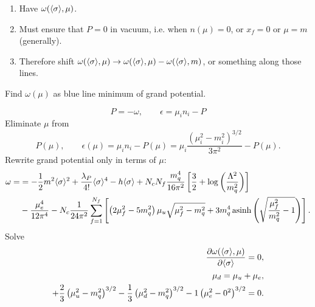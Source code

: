 \begin{enumerate}
\item Have $\omega(\langle \sigma \rangle, \mu)$.
\item Must ensure that $P = 0$ in vacuum, i.e. when $n(\mu) = 0$, or $x_f = 0$ or $\mu = m$ (generally).
\item Therefore shift $\omega(\langle \sigma \rangle,\mu) \rightarrow \omega(\langle \sigma \rangle,\mu) - \omega(\langle \sigma \rangle,m)$, or something along those lines.
\end{enumerate}

Find $\omega(\mu)$ as blue line minimum of grand potential.

\begin{equation}
	P = -\omega, \qquad
	\epsilon = \mu_i n_i - P
\end{equation}
Eliminate $\mu$ from
\begin{equation}
	P(\mu), \qquad
	\epsilon(\mu) = \mu_i n_i - P(\mu) = \mu_i \frac{(\mu_i^2-m_i^2)^{3/2}}{3 \pi^2} - P(\mu) .
\end{equation}
Rewrite grand potential only in terms of $\mu$:
\begin{equation}
\begin{split}
	\omega = &= -\frac12 m^2 \langle \sigma \rangle^2 + \frac{\lambda_P}{4!} \langle \sigma \rangle^4 - h \langle \sigma \rangle + N_c N_f \frac{m_q^4}{16 \pi^2} \left[ \frac{3}{2} + \log\left(\frac{{\Lambda}^2}{m_q^2}\right) \right] \\
	         &- \frac{\mu_e^4}{12 \pi^4} - N_c \frac{1}{24 \pi^2} \sum_{f=1}^{N_f} \left[ \left( 2 \mu_f^2 - 5 m_q^2 \right) \mu_u \sqrt{\mu_f^2 - m_q^2} + 3 m_q^4 \operatorname{asinh} \left( \sqrt{\frac{\mu_f^2}{m_q^2}-1} \right) \right] .
\end{split}
\label{eq:lsm:grand_potential}
\end{equation}
Solve
\begin{subequations}
\begin{align}
	\pdv{\omega( \langle \sigma \rangle, \mu)}{ \langle \sigma \rangle} = 0 , \\
	\mu_d = \mu_u + \mu_e , \\
	+\frac23 \left( \mu_u^2 - m_q^2 \right)^{3/2} - \frac13 \left( \mu_d^2 - m_q^2 \right)^{3/2} - 1 \left( \mu_e^2 - 0^2 \right)^{3/2} = 0 .
\end{align}
\end{subequations}




